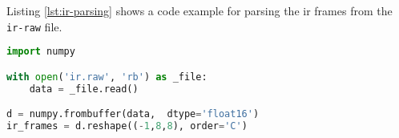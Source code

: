 Listing \ref{lst:ir-parsing} shows a code example for parsing the \gls{ir} frames from the \texttt{ir-raw} file.

\begin{lstlisting}[language=Python, caption={Code example for parsing infrared from file},label={lst:ir-parsing}]
import numpy

with open('ir.raw', 'rb') as _file:
    data = _file.read()

d = numpy.frombuffer(data,  dtype='float16')
ir_frames = d.reshape((-1,8,8), order='C')
\end{lstlisting}